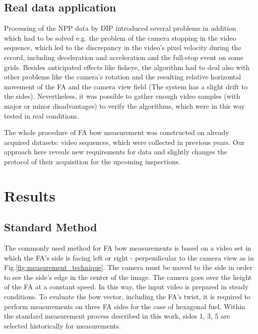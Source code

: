 \documentclass[preprint,12pt]{elsarticle}
\begin{document}
\subsection{Real data application}
Processing of the \ac{NPP} data by \ac{DIP} introduced several problems in addition which had to be solved e.g. the problem of the camera stopping in the video sequence, which led to the discrepancy in the video's pixel velocity during the record, including deceleration and acceleration and the full-stop event on some grids. Besides anticipated effects like fisheye, the algorithm had to deal also with other problems like the camera's rotation and the resulting relative horizontal movement of the \ac{FA} and the camera view field (The system has a slight drift to the sides). Nevertheless, it was possible to gather enough video samples (with major or minor disadvantages) to verify the algorithms, which were in this way tested in real conditions.

The whole procedure of \ac{FA} bow measurement was constructed on already acquired datasets: video sequences, which were collected in previous years. Our approach here reveals new requirements for data and slightly changes the protocol of their acquisition for the upcoming inspections.

\section{Results}

\subsection{Standard Method} 

The commonly used method for \ac{FA} bow measurements is based on a video set in which the \ac{FA}'s side is facing left or right - perpendicular to the camera view as in Fig.\ref{fig:measurement_technique}. The camera must be moved to the side in order to see the side's edge in the center of the image. The camera goes over the height of the \ac{FA} at a constant speed. In this way, the input video is prepared in steady conditions. To evaluate the bow vector, including the \ac{FA}'s twist, it is required to perform measurements on three \ac{FA} sides for the case of hexagonal fuel. Within the standard measurement process described in this work, sides 1, 3, 5 are selected historically for measurements.
\end{document}
